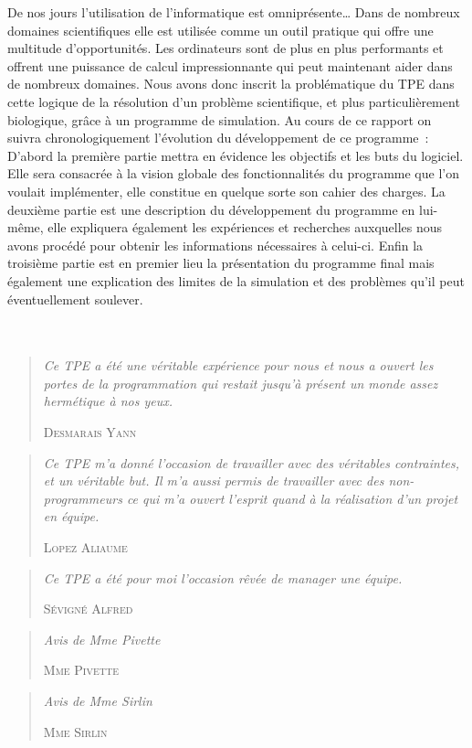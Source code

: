 De nos jours l’utilisation de l’informatique est omniprésente… Dans de nombreux domaines scientifiques elle est utilisée comme un outil  pratique qui offre une multitude d’opportunités. Les ordinateurs sont de plus en plus performants et offrent une puissance de calcul impressionnante qui peut maintenant aider dans de nombreux domaines. Nous avons donc inscrit la problématique du TPE dans cette logique de la résolution d’un problème scientifique, et plus particulièrement biologique, grâce à un programme de simulation. Au cours de ce rapport on suivra chronologiquement l’évolution du développement de ce programme : D’abord la première partie mettra en évidence les objectifs et les buts du logiciel. Elle sera consacrée à la vision globale des fonctionnalités du programme que l’on voulait implémenter, elle constitue en quelque sorte son cahier des charges. La deuxième partie est une description du développement du programme en lui-même, elle expliquera également les expériences et recherches auxquelles nous avons procédé pour obtenir les informations nécessaires à celui-ci. Enfin la troisième partie est en premier lieu la présentation du programme final mais également une explication des limites de la simulation et des problèmes qu’il peut éventuellement soulever. \\ \\ \\

\begin{quotation}
  \textit{
    Ce TPE a été une véritable expérience pour nous et nous a ouvert les portes de la programmation qui restait jusqu'à présent un monde assez hermétique à nos yeux.
  }
  \begin{flushright}
    \textsc{Desmarais Yann}
  \end{flushright}
\end{quotation}

\begin{quotation}
  \textit{
    Ce TPE m'a donné l'occasion de travailler avec des véritables contraintes, et un véritable but.
    Il m'a aussi permis de travailler avec des non-programmeurs ce qui m'a ouvert l'esprit quand à la réalisation d'un projet en équipe.
  }
  \begin{flushright}
    \textsc{Lopez Aliaume}
  \end{flushright}
\end{quotation}

\begin{quotation}
  \textit{
    Ce TPE a été pour moi l'occasion rêvée de manager une équipe.
  }
  \begin{flushright}
    \textsc{Sévigné Alfred}
  \end{flushright}
\end{quotation}

\begin{quotation}
  \textit{
    Avis de Mme Pivette
  }
  \begin{flushright}
    \textsc{Mme Pivette}
  \end{flushright}
\end{quotation}

\begin{quotation}
  \textit{
    Avis de Mme Sirlin
  }
  \begin{flushright}
    \textsc{Mme Sirlin}
  \end{flushright}
\end{quotation}

